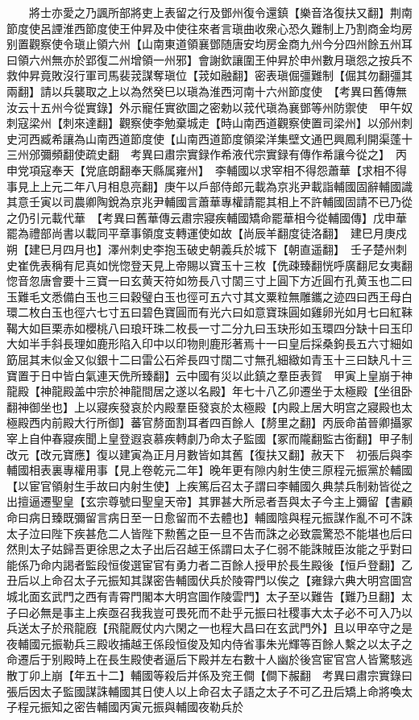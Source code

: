 　　將士亦愛之乃諷所部將吏上表留之行及鄧州復令還鎮【樂音洛復扶又翻】荆南節度使呂諲淮西節度使王仲昇及中使往來者言瑱曲收衆心恐久難制上乃割商金均房别置觀察使令瑱止領六州【山南東道領襄鄧随唐安均房金商九州今分四州餘五州耳曰領六州無亦於郢復二州增領一州邪】會謝欽讓圍王仲昇於申州數月瑱怨之按兵不救仲昇竟敗沒行軍司馬裴茙謀奪瑱位【茙如融翻】密表瑱倔彊難制【倔其勿翻彊其兩翻】請以兵襲取之上以為然癸巳以瑱為淮西河南十六州節度使　【考異曰舊傳無汝云十五州今從實錄】外示寵任實欲圖之密勅以茙代瑱為襄鄧等州防禦使　甲午奴刺寇梁州【刺來達翻】觀察使李勉棄城走【時山南西道觀察使置司梁州】以邠州刺史河西臧希讓為山南西道節度使【山南西道節度領梁洋集壁文通巴興鳳利開渠蓬十三州邠彌頻翻使疏史翻　考異曰肅宗實録作希液代宗實録有傳作希讓今從之】　丙申党項寇奉天【党底朗翻奉天縣属雍州】　李輔國以求宰相不得怨蕭華【求相不得事見上上元二年八月相息亮翻】庚午以戶部侍郎元載為京兆尹載詣輔國固辭輔國識其意壬寅以司農卿陶銳為京兆尹輔國言蕭華專權請罷其相上不許輔國固請不已乃從之仍引元載代華　【考異曰舊華傳云肅宗寢疾輔國矯命罷華相今從輔國傳】戊申華罷為禮部尚書以載同平章事領度支轉運使如故【尚辰羊翻度徒洛翻】　建巳月庚戍朔【建巳月四月也】澤州刺史李抱玉破史朝義兵於城下【朝直遥翻】　壬子楚州刺史崔侁表稱有尼真如恍惚登天見上帝賜以寶玉十三枚【侁疎臻翻恍呼廣翻尼女夷翻惚音忽唐會要十三寶一曰玄黄天符如笏長八寸䦚三寸上圓下方近圓冇孔黄玉也二曰玉難毛文悉備白玉也三曰穀璧白玉也徑可五六寸其文粟粒無雕鑴之迹四曰西王母白環二枚白玉也徑六七寸五曰碧色寶圓而有光六曰如意寶珠圓如雞卵光如月七曰紅靺鞨大如巨栗赤如櫻桃八曰琅玕珠二枚長一寸二分九曰玉玦形如玉環四分缺十曰玉印大如半手斜長理如鹿形陷入印中以印物則鹿形著焉十一曰皇后採桑鉤長五六寸細如筯屈其末似金又似銀十二曰雷公石斧長四寸闊二寸無孔細緻如青玉十三曰缺凡十三寶置于日中皆白氣連天侁所臻翻】云中國有災以此鎮之羣臣表賀　甲寅上皇崩于神龍殿【神龍殿盖中宗於神龍間居之遂以名殿】年七十八乙卯遷坐于太極殿【坐徂卧翻神御坐也】上以寢疾發哀於内殿羣臣發哀於太極殿【内殿上居大明宫之寢殿也太極殿西内前殿大行所御】蕃官剺面割耳者四百餘人【剺里之翻】丙辰命苖晉卿攝冢宰上自仲春寢疾聞上皇登遐哀慕疾轉劇乃命太子監國【冢而隴翻監古銜翻】甲子制改元【改元寶應】復以建寅為正月月數皆如其舊【復扶又翻】赦天下　初張后與李輔國相表裏專權用事【見上卷乾元二年】晚年更有隙内射生使三原程元振黨於輔國【以宦官領射生手故曰内射生使】上疾篤后召太子謂曰李輔國久典禁兵制勑皆從之出擅逼遷聖皇【玄宗尊號曰聖皇天帝】其罪甚大所忌者吾與太子今主上彌留【書顧命曰病日臻既彌留言病日至一日愈留而不去體也】輔國陰與程元振謀作亂不可不誅太子泣曰陛下疾甚危二人皆陛下勲舊之臣一旦不告而誅之必致震驚恐不能堪也后曰然則太子姑歸吾更徐思之太子出后召越王係謂曰太子仁弱不能誅賊臣汝能之乎對曰能係乃命内謁者監段恒俊選宦官有勇力者二百餘人授甲於長生殿後【恒戶登翻】乙丑后以上命召太子元振知其謀密告輔國伏兵於陵霄門以俟之【雍録六典大明宫圖宫城北面玄武門之西有青霄門閣本大明宫圖作陵雲門】太子至以難告【難乃旦翻】太子曰必無是事主上疾亟召我我豈可畏死而不赴乎元振曰社稷事大太子必不可入乃以兵送太子於飛龍廐【飛龍厩仗内六閑之一也程大昌曰在玄武門外】且以甲卒守之是夜輔國元振勒兵三殿收捕越王係段恒俊及知内侍省事朱光輝等百餘人繫之以太子之命遷后于别殿時上在長生殿使者逼后下殿并左右數十人幽於後宫宦官宫人皆驚駭逃散丁卯上崩【年五十二】輔國等殺后并係及兖王僴【僴下赧翻　考異曰肅宗實錄曰張后因太子監國謀誅輔國其日使人以上命召太子語之太子不可乙丑后矯上命將喚太子程元振知之密告輔國丙寅元振與輔國夜勒兵於